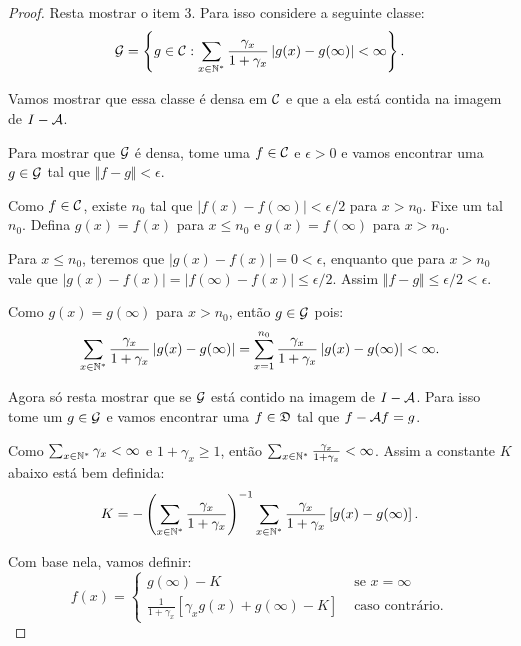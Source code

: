 \begin{proof}
  Resta mostrar o item 3. Para isso considere a seguinte classe:
  \begin{equation}
    \label{eq:imagem-gerador}
    {\mathcal{G}} = \left\{ g \in {\mathcal{C}}: \sum_{x \in {\mathbb{N^*}}} \frac{\gamma_x}{1 +
        \gamma_x} \left| g(x) - g(\infty) \right| < \infty \right\}.
  \end{equation}

  Vamos mostrar que essa classe é densa em ${\mathcal{C}}$ e que a ela está
  contida na imagem de $I - {\mathcal{A}}$.

  Para mostrar que ${\mathcal{G}}$ é densa, tome uma $f \in {\mathcal{C}}$ e $\epsilon >
  0$ e vamos encontrar uma $g \in {\mathcal{G}}$ tal que $\Vert f - g \Vert <
  \epsilon$.

  Como $f \in {\mathcal{C}}$, existe $n_0$ tal que $|f(x) - f(\infty)| <
  \epsilon/2$ para $x > n_0$. Fixe um tal $n_0$. Defina $g(x) = f(x)$
  para $x \leq n_0$ e $g(x) = f(\infty)$ para $x > n_0$.

  Para $x \leq n_0$, teremos que $|g(x) - f(x)| = 0 < \epsilon$,
  enquanto que para $x > n_0$ vale que $|g(x) - f(x)| = |f(\infty) -
  f(x)| \leq \epsilon/2$. Assim $\Vert f - g \Vert \leq \epsilon/2 <
  \epsilon$.

  Como $g(x) = g(\infty)$ para $x > n_0$, então $g \in {\mathcal{G}}$ pois:
  \begin{displaymath}
    \sum_{x \in {\mathbb{N^*}}} \frac{\gamma_x}{1 +
        \gamma_x} \left| g(x) - g(\infty) \right|
      =
      \sum_{x = 1}^{n_0} \frac{\gamma_x}{1 +
        \gamma_x} \left| g(x) - g(\infty) \right| <  \infty.
  \end{displaymath}

  Agora só resta mostrar que se ${\mathcal{G}}$ está contido na imagem de $I -
  {\mathcal{A}}$. Para isso tome um $g \in {\mathcal{G}}$ e vamos encontrar uma $f \in
  {\mathfrak{D}}$ tal que $f - {\mathcal{A}} f = g$.

  Como $\sum_{x \in {\mathbb{N^*}}} \gamma_x < \infty$ e $1 + \gamma_x \geq 1$,
  então $\sum_{x \in {\mathbb{N^*}}} \frac{\gamma_x}{1+\gamma_x} < \infty$. Assim
  a constante $K$ abaixo está bem definida:
  \begin{displaymath}
    K = -\left( \sum_{x \in {\mathbb{N^*}}} \frac{\gamma_x}{1+\gamma_x} \right)^{-1}
    \sum_{x \in {\mathbb{N^*}}} \frac{\gamma_x}{1 +
      \gamma_x} \left[ g(x) - g(\infty) \right].
  \end{displaymath}

  Com base nela, vamos definir:
  \begin{equation}
    \label{eq:inversa-imagem}
    f(x) = \begin{cases}
      g(\infty) - K & \textrm{ se } x = \infty\\
      \frac{1}{1+\gamma_x} \left[
        \gamma_x g(x) + g(\infty) - K
      \right] & \textrm{ caso contrário.}
    \end{cases}
  \end{equation}


\end{proof}
